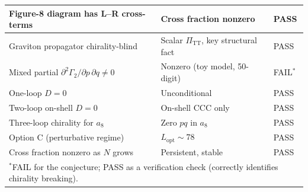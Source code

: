 \documentclass[11pt,a4paper]{article}
\newcommand{\PiTT}{\Pi_{\mathrm{TT}}}
\theoremstyle{definition}
\begin{document}
\begin{table}[h]
\begin{tabular}{lll}
Figure-8 diagram has L--R cross-terms
  & Cross fraction nonzero & \textcolor{proven}{PASS} \\
\midrule
Graviton propagator chirality-blind
  & Scalar $\PiTT$, key structural fact & \textcolor{proven}{PASS} \\
\midrule
Mixed partial $\partial^2\Gamma_2/\partial p\,\partial q \neq 0$
  & Nonzero (toy model, 50-digit) & \textcolor{disproven}{FAIL$^*$} \\
\midrule
One-loop $D = 0$
  & Unconditional & \textcolor{proven}{PASS} \\
Two-loop on-shell $D = 0$
  & On-shell CCC only & \textcolor{proven}{PASS} \\
Three-loop chirality for $a_8$
  & Zero $pq$ in $a_8$ & \textcolor{proven}{PASS} \\
Option C (perturbative regime)
  & $L_{\mathrm{opt}} \sim 78$ & \textcolor{proven}{PASS} \\
\midrule
Cross fraction nonzero as $N$ grows
  & Persistent, stable & \textcolor{proven}{PASS} \\
\bottomrule
\multicolumn{3}{l}{\footnotesize $^*$FAIL for the conjecture; PASS as a
  verification check (correctly identifies chirality breaking).}
\end{tabular}
\end{table}


\end{document}
